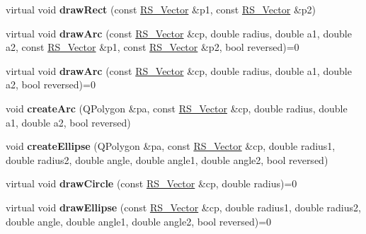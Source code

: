 \begin{DoxyCompactItemize}
\item 
\hypertarget{classRS__Painter_a71fd68254615cf767e0339d7dd24248e}{virtual void {\bfseries draw\-Rect} (const \hyperlink{classRS__Vector}{R\-S\-\_\-\-Vector} \&p1, const \hyperlink{classRS__Vector}{R\-S\-\_\-\-Vector} \&p2)}\label{classRS__Painter_a71fd68254615cf767e0339d7dd24248e}

\item 
\hypertarget{classRS__Painter_a602d646911767b4971ecae5a743e99a7}{virtual void {\bfseries draw\-Arc} (const \hyperlink{classRS__Vector}{R\-S\-\_\-\-Vector} \&cp, double radius, double a1, double a2, const \hyperlink{classRS__Vector}{R\-S\-\_\-\-Vector} \&p1, const \hyperlink{classRS__Vector}{R\-S\-\_\-\-Vector} \&p2, bool reversed)=0}\label{classRS__Painter_a602d646911767b4971ecae5a743e99a7}

\item 
\hypertarget{classRS__Painter_acd8b8b5fb18669b91b1f6010650a44db}{virtual void {\bfseries draw\-Arc} (const \hyperlink{classRS__Vector}{R\-S\-\_\-\-Vector} \&cp, double radius, double a1, double a2, bool reversed)=0}\label{classRS__Painter_acd8b8b5fb18669b91b1f6010650a44db}

\item 
\hypertarget{classRS__Painter_adebc18b790e49d2dfad8598a18301820}{void {\bfseries create\-Arc} (Q\-Polygon \&pa, const \hyperlink{classRS__Vector}{R\-S\-\_\-\-Vector} \&cp, double radius, double a1, double a2, bool reversed)}\label{classRS__Painter_adebc18b790e49d2dfad8598a18301820}

\item 
\hypertarget{classRS__Painter_a1fc5b87c7101968aeccab99ac92cef8b}{void {\bfseries create\-Ellipse} (Q\-Polygon \&pa, const \hyperlink{classRS__Vector}{R\-S\-\_\-\-Vector} \&cp, double radius1, double radius2, double angle, double angle1, double angle2, bool reversed)}\label{classRS__Painter_a1fc5b87c7101968aeccab99ac92cef8b}

\item 
\hypertarget{classRS__Painter_a98680df13196e5db8b9d1e73d7d72650}{virtual void {\bfseries draw\-Circle} (const \hyperlink{classRS__Vector}{R\-S\-\_\-\-Vector} \&cp, double radius)=0}\label{classRS__Painter_a98680df13196e5db8b9d1e73d7d72650}

\item 
\hypertarget{classRS__Painter_abf2b32a5e4e37b8e800c0bc0a666c14e}{virtual void {\bfseries draw\-Ellipse} (const \hyperlink{classRS__Vector}{R\-S\-\_\-\-Vector} \&cp, double radius1, double radius2, double angle, double angle1, double angle2, bool reversed)=0}\label{classRS__Painter_abf2b32a5e4e37b8e800c0bc0a666c14e}


\end{DoxyCompactItemize}
